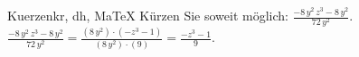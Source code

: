 \begin{MAufgabe}{Kuerzen}{kr, dh, MaTeX}
K\"urzen Sie soweit m\"oglich: $\frac{ - 8\, y^2\, z^3 - 8\, y^2}{72\, y^2}$.\\ 
\ifLsg\MLoesung
\quad $\frac{ - 8\, y^2\, z^3 - 8\, y^2}{72\, y^2}=\frac{(8\, y^2)\cdot( - z^3 - 1)}{(8\, y^2)\cdot(9)}=\frac{ - z^3 - 1}{9}$.\else\relax\fi
 \end{MAufgabe}